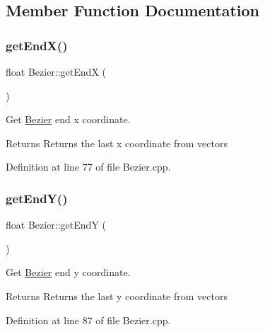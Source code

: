 \subsection{Member Function Documentation}
\mbox{\label{classBezier_aef4b9fbe3b5d30ea6b42de7fc38cf796}} 
\subsubsection{\texorpdfstring{get\+End\+X()}{getEndX()}}
{\footnotesize\ttfamily float Bezier\+::get\+EndX (\begin{DoxyParamCaption}{ }\end{DoxyParamCaption})}



Get \mbox{\hyperlink{classBezier}{Bezier}} end x coordinate. 

\begin{DoxyReturn}{Returns}
Returns the last x coordinate from vectors 
\end{DoxyReturn}


Definition at line 77 of file Bezier.\+cpp.

\mbox{\label{classBezier_abb9094c95311d916aad946d90a9b5c12}} 
\subsubsection{\texorpdfstring{get\+End\+Y()}{getEndY()}}
{\footnotesize\ttfamily float Bezier\+::get\+EndY (\begin{DoxyParamCaption}{ }\end{DoxyParamCaption})}



Get \mbox{\hyperlink{classBezier}{Bezier}} end y coordinate. 

\begin{DoxyReturn}{Returns}
Returns the last y coordinate from vectors 
\end{DoxyReturn}


Definition at line 87 of file Bezier.\+cpp.

\mbox{\label{classBezier_a81efbcfa1f2bc8bf3c539dba1a4b80e0}} 
